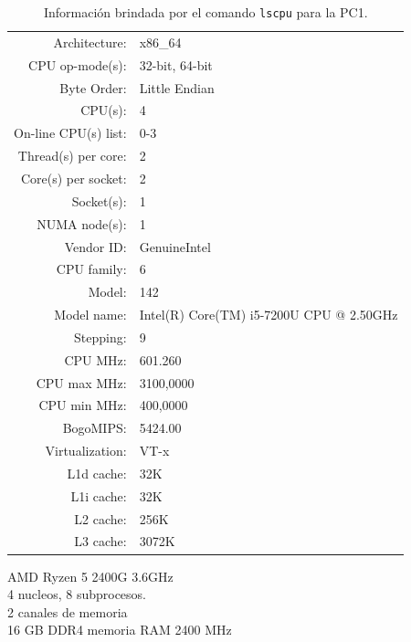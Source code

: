 \documentclass{article}
\begin{document}
\begin{description}[align=right]
        \begin{table}[H] 
            \centering
            \begin{tabular}{ r l } 
                Architecture: & x86\_64\\ 
                CPU op-mode(s): & 32-bit, 64-bit\\ 
                Byte Order: & Little Endian \\ 
                CPU(s): & 4\\ 
                On-line CPU(s) list: & 0-3 \\ 
                Thread(s) per core: & 2 \\ 
                Core(s) per socket: & 2 \\
                Socket(s): & 1 \\
                NUMA node(s): & 1\\ 
                Vendor ID: & GenuineIntel \\
                CPU family: & 6 \\
                Model: & 142 \\
                Model name: & Intel(R) Core(TM) i5-7200U CPU @ 2.50GHz \\
                Stepping: & 9 \\
                CPU MHz: & 601.260 \\
                CPU max MHz: & 3100,0000 \\
                CPU min MHz: & 400,0000 \\
                BogoMIPS: & 5424.00 \\
                Virtualization: & VT-x \\
                L1d cache: & 32K \\
                L1i cache: & 32K \\
                L2 cache: & 256K \\
                L3 cache: & 3072K\\
            \end{tabular}
            \caption{Información brindada por el comando \texttt{lscpu} para la PC1.}
        \end{table}
    \item [PC2] AMD Ryzen 5 2400G 3.6GHz\\
        4 nucleos, 8 subprocesos.\\
        2 canales de memoria\\
        16 GB DDR4 memoria RAM 2400 MHz


\end{description}
\end{document}
